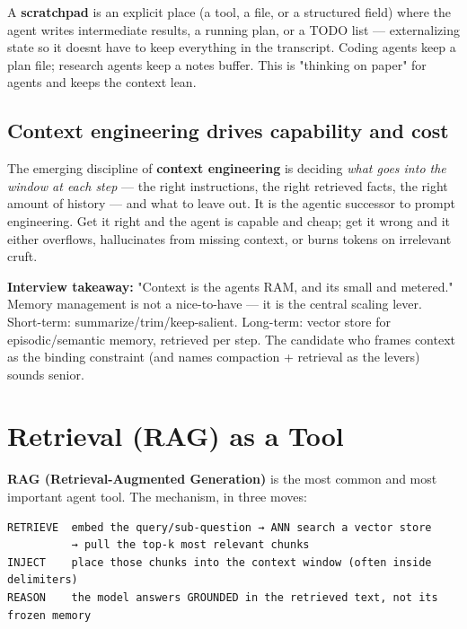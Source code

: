 \documentclass[11pt]{article}
\begin{document}
A \textbf{scratchpad} is an explicit place (a tool, a file, or a structured field) where the agent writes intermediate results, a running plan, or a TODO list --- externalizing state so it doesn\textquotesingle t have to keep everything in the transcript. Coding agents keep a plan file; research agents keep a notes buffer. This is "thinking on paper" for agents and keeps the context lean.

\subsection{Context engineering drives capability and cost}\label{context-engineering-drives-capability-and-cost}

The emerging discipline of \textbf{context engineering} is deciding \emph{what goes into the window at each step} --- the right instructions, the right retrieved facts, the right amount of history --- and what to leave out. It is the agentic successor to prompt engineering. Get it right and the agent is capable and cheap; get it wrong and it either overflows, hallucinates from missing context, or burns tokens on irrelevant cruft.

\textbf{Interview takeaway:} "Context is the agent\textquotesingle s RAM, and it\textquotesingle s small and metered." Memory management is not a nice-to-have --- it is the central scaling lever. Short-term: summarize/trim/keep-salient. Long-term: vector store for episodic/semantic memory, retrieved per step. The candidate who frames context as the binding constraint (and names compaction + retrieval as the levers) sounds senior.

\section{Retrieval (RAG) as a Tool}\label{retrieval-rag-as-a-tool}

\textbf{RAG (Retrieval-Augmented Generation)} is the most common and most important agent tool. The mechanism, in three moves:

\setcodelang{}

\begin{verbatim}
RETRIEVE  embed the query/sub-question → ANN search a vector store
          → pull the top-k most relevant chunks
INJECT    place those chunks into the context window (often inside delimiters)
REASON    the model answers GROUNDED in the retrieved text, not its frozen memory
\end{verbatim}
\end{document}
